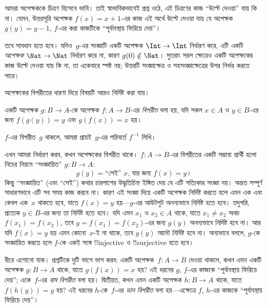 \documentclass[../../../include/open-logic-section]{subfiles}
\begin{document}

\begin{explain}
আমরা অপেক্ষককে চিত্রণ হিসেবে ভাবি। তাই স্বাভাবিকভাবেই প্রশ্ন ওঠে, এই চিত্রণের কাজ ``উল্টে দেওয়া'' যায় কি না। যেমন, উত্তরসূরি অপেক্ষক $f(x) = x + 1$-এর কাজ এই অর্থে উল্টে দেওয়া যায় যে অপেক্ষক $g(y) = y - 1$, $f$-এর করা কাজটিকে ``পূর্বাবস্থায় ফিরিয়ে দেয়''।

তবে সাবধান হতে হবে। যদিও~$g$-এর সংজ্ঞাটি একটি অপেক্ষক $\Int \to \Int$ নির্ধারণ করে, এটি একটি \emph{অপেক্ষক} $\Nat
\to \Nat$ নির্ধারণ করে না, কারণ $g(0) \notin \Nat$। সুতরাং সরল ক্ষেত্রেও একটি অপেক্ষকের কাজ উল্টে দেওয়া যায় কি না, তা একেবারে স্পষ্ট নয়; উত্তরটি সংজ্ঞাক্ষেত্র ও সহসংজ্ঞাক্ষেত্রের উপর নির্ভর করতে পারে।

অপেক্ষকের বিপরীতের ধারণা দিয়ে বিষয়টি আরও নির্দিষ্ট করা যায়।
\end{explain}

\begin{defn}
একটি অপেক্ষক $g \colon B \to A$-কে অপেক্ষক $f
\colon A \to B$-এর \emph{বিপরীত} বলা হয়, যদি সকল $x \in A$ ও $y \in B$-এর জন্য $f(g(y)) = y$ এবং $g(f(x)) = x$ হয়।
\end{defn}

$f$-এর বিপরীত~$g$ থাকলে, আমরা প্রায়ই~$g$-এর পরিবর্তে $f^{-1}$ লিখি।

\begin{explain}
এখন আমরা নির্ধারণ করব, কখন অপেক্ষকের বিপরীত থাকে। $f\colon A \to B$-এর বিপরীতের একটি সম্ভাব্য প্রার্থী হলো নিচের নিয়মে ``সংজ্ঞায়িত'' $g\colon B \to A$:
\[
g(y) = \text{``সেই'' $x$, যার জন্য $f(x) = y$।}
\]
কিন্তু ``সংজ্ঞায়িত'' (এবং ``সেই'') কথার চারপাশের উদ্ধৃতিচিহ্ন ইঙ্গিত দেয় যে এটি সত্যিকার সংজ্ঞা নয়। অন্তত সম্পূর্ণ সাধারণভাবে এটি সব সময় কাজ করবে না। কারণ এই সংজ্ঞা দিয়ে একটি অপেক্ষক নির্দিষ্ট করতে হলে এমন এক এবং কেবল এক~$x$ থাকতে হবে, যাতে $f(x) =
y$ হয়—$g$-এর আউটপুট অনন্যভাবে নির্দিষ্ট হতে হবে। তদুপরি, প্রত্যেক $y \in B$-এর জন্য তা নির্দিষ্ট হতে হবে। যদি এমন $x_1$ ও $x_2 \in
A$ থাকে, যাতে $x_1 \neq x_2$ অথচ $f(x_1) = f(x_2)$, তবে $y = f(x_1) = f(x_2)$-এর জন্য $g(y)$ অনন্যভাবে নির্দিষ্ট হবে না। আর যদি $f(x) = y$ হয় এমন কোনো~$x$-ই না থাকে, তবে $g(y)$ আদৌ নির্দিষ্ট হবে না। অন্যভাবে বললে, $g$-কে সংজ্ঞায়িত করতে হলে $f$-কে একই সঙ্গে !!{injective} ও !!{surjective} হতে হবে।

ধীরে এগোনো যাক। প্রশ্নটিকে দুটি ভাগে ভাগ করব: একটি অপেক্ষক~$f\colon A \to B$ দেওয়া থাকলে, কখন এমন একটি অপেক্ষক $g\colon B \to A$ থাকে, যাতে $g(f(x)) = x$ হয়? এই ধরনের $g$, $f$-এর কাজকে ``পূর্বাবস্থায় ফিরিয়ে দেয়''; একে~$f$-এর \emph{বাম বিপরীত} বলা হয়। দ্বিতীয়ত, কখন এমন একটি অপেক্ষক $h\colon B \to A$ থাকে, যাতে $f(h(y)) = y$ হয়? এই ধরনের $h$-কে~$f$-এর \emph{ডান বিপরীত} বলা হয়—এক্ষেত্রে $f$, $h$-এর কাজকে ``পূর্বাবস্থায় ফিরিয়ে দেয়''।
\end{explain}
\end{document}
